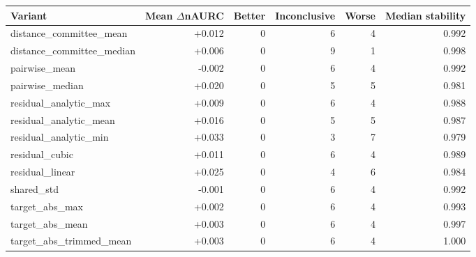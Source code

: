 \begin{tabular}{lrrrrr}
\toprule
Variant & Mean $\Delta$nAURC & Better & Inconclusive & Worse & Median stability \\
\midrule
distance\_committee\_mean & +0.012 & 0 & 6 & 4 & 0.992 \\
distance\_committee\_median & +0.006 & 0 & 9 & 1 & 0.998 \\
pairwise\_mean & -0.002 & 0 & 6 & 4 & 0.992 \\
pairwise\_median & +0.020 & 0 & 5 & 5 & 0.981 \\
residual\_analytic\_max & +0.009 & 0 & 6 & 4 & 0.988 \\
residual\_analytic\_mean & +0.016 & 0 & 5 & 5 & 0.987 \\
residual\_analytic\_min & +0.033 & 0 & 3 & 7 & 0.979 \\
residual\_cubic & +0.011 & 0 & 6 & 4 & 0.989 \\
residual\_linear & +0.025 & 0 & 4 & 6 & 0.984 \\
shared\_std & -0.001 & 0 & 6 & 4 & 0.992 \\
target\_abs\_max & +0.002 & 0 & 6 & 4 & 0.993 \\
target\_abs\_mean & +0.003 & 0 & 6 & 4 & 0.997 \\
target\_abs\_trimmed\_mean & +0.003 & 0 & 6 & 4 & 1.000 \\
\bottomrule
\end{tabular}
